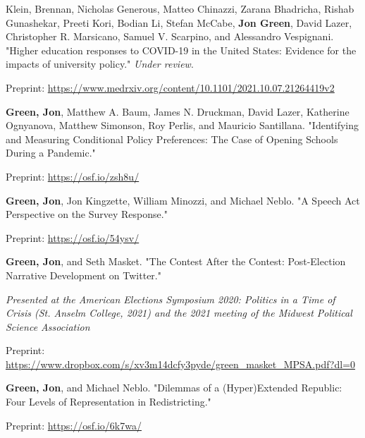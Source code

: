 \documentclass[letterpaper]{article}
\renewenvironment{itemize}{
  \begin{list}{}{
    \setlength{\leftmargin}{1.5em}
  }
}{
  \end{list}
}
\begin{document}
\begin{itemize}
\item Klein, Brennan, Nicholas Generous, Matteo Chinazzi, Zarana Bhadricha, Rishab Gunashekar, Preeti Kori, Bodian Li, Stefan McCabe, \textbf{Jon Green}, David Lazer, Christopher R. Marsicano, Samuel V. Scarpino, and Alessandro Vespignani. "Higher education responses to COVID-19 in the United States: Evidence for the impacts of university policy." \textit{Under review}.
\begin{itemize}
\item Preprint: \url{https://www.medrxiv.org/content/10.1101/2021.10.07.21264419v2}
\end{itemize}

\item  \textbf{Green, Jon}, Matthew A. Baum, James N. Druckman, David Lazer, Katherine Ognyanova, Matthew Simonson, Roy Perlis, and Mauricio Santillana. "Identifying and Measuring Conditional Policy Preferences: The Case of Opening Schools During a Pandemic." 
\begin{itemize}
\item Preprint: \url{https://osf.io/zsh8u/}
\end{itemize}

\item \textbf{Green, Jon}, Jon Kingzette, William Minozzi, and Michael Neblo. "A Speech Act Perspective on the Survey Response." 
\begin{itemize}
\item Preprint: \url{https://osf.io/54ysv/}
\end{itemize}

\item \textbf{Green, Jon}, and Seth Masket. "The Contest After the Contest: Post-Election Narrative Development on Twitter." 
\begin{itemize}
\item \textit{Presented at the American Elections Symposium 2020: Politics in a Time of Crisis (St. Anselm College, 2021) and the 2021 meeting of the Midwest Political Science Association}
\item Preprint: \url{https://www.dropbox.com/s/xv3m14dcfy3pyde/green_masket_MPSA.pdf?dl=0}
\end{itemize}

\item \textbf{Green, Jon}, and Michael Neblo. "Dilemmas of a (Hyper)Extended Republic: Four Levels of Representation in Redistricting." 
\begin{itemize}
\item Preprint: \url{https://osf.io/6k7wa/}
\end{itemize}

\end{itemize}
\end{document}
